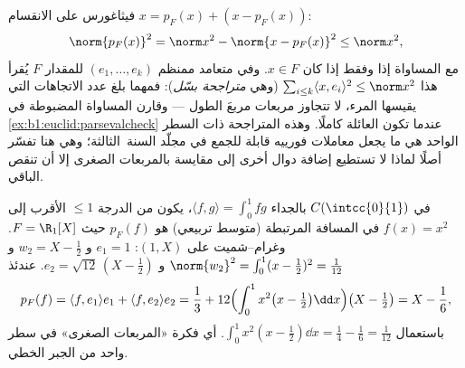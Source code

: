 \begin{example}
\label{ex:b1:euclid:bessel}
 فيثاغورس على الانقسام $x = p_F(x) + (x - p_F(x))$:
\[
\norm{p_F(x)}^2 = \norm x^2 - \norm{x - p_F(x)}^2 \leq
\norm x^2 ,
\]
مع المساواة إذا وفقط إذا كان $x \in F$. وفي  متعامد ممنظم $(e_1,
\dots, e_k)$ للمقدار $F$ يُقرأ هذا $\sum_{i \leq k}\langle x,
e_i\rangle^2 \leq \norm x^2$ (وهي \emph{متراجحة بسّل}):
فمهما بلغ عدد الاتجاهات  التي يقيسها المرء، لا تتجاوز
مربعات  مربعَ الطول --- وقارن
المساواة المضبوطة في \cref{ex:b1:euclid:parsevalcheck} عندما تكون
العائلة  كاملًا. وهذه المتراجحة ذات السطر الواحد هي ما يجعل
معاملات فورييه قابلة للجمع في مجلّد السنة~الثالثة؛ وهي هنا
تفسّر أصلًا لماذا لا تستطيع إضافة دوال  أخرى إلى مقايسة
بالمربعات الصغرى إلا أن تنقص الباقي.
\end{example}

\begin{example}\label{ex:b1:euclid:bestapprox}
في $C(\intcc{0}{1})$ بالجداء $\langle f, g\rangle = \int_0^1 fg$، يكون
 من الدرجة $\leq 1$ الأقرب إلى $f(x) = x^2$ في
المسافة المرتبطة (متوسط تربيعي) هو $p_F(f)$ حيث $F = \R_1[X]$.
وغرام--شميت على $(1, X)$: $e_1 = 1$ و $w_2 = X - \frac12$ و
$\norm{w_2}^2 = \int_0^1 (x - \frac12)^2 = \frac{1}{12}$ و $e_2 =
\sqrt{12}\,(X - \tfrac12)$. عندئذ
\[
p_F(f) = \langle f, e_1\rangle e_1 + \langle f, e_2\rangle e_2
= \frac13 + 12\Bigl(\int_0^1 x^2\bigl(x - \tfrac12\bigr)\dd
x\Bigr)\bigl(X - \tfrac12\bigr)
= X - \frac{1}{6},
\]
باستعمال $\int_0^1 x^2(x - \frac12)\dd x = \frac14 - \frac16 =
\frac{1}{12}$. أي فكرة «المربعات الصغرى» في سطر واحد من الجبر
الخطي.
\end{example}


